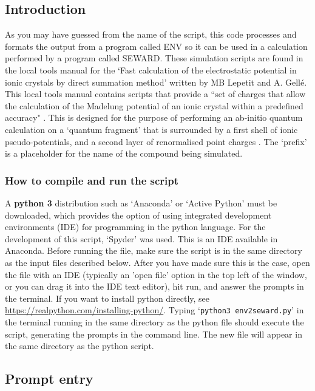 \documentclass[10pt]{article}
\begin{document}
\subsection{Introduction}
As you may have guessed from the name of the script, this code processes and formats the output from a program called ENV so it can be used in a calculation performed by a program called SEWARD. These simulation scripts are found in the local tools manual for the `Fast calculation of the electrostatic potential in ionic crystals by direct summation method' written by MB Lepetit and A. Gellé. This local tools manual contains scripts that provide a ``set of charges that allow the calculation of the Madelung potential of an ionic crystal within a predefined accuracy" \cite{gelle2008fast}. This is designed for the purpose of performing an ab-initio quantum calculation on a `quantum fragment' that is surrounded by a first shell of ionic pseudo-potentials, and a second layer of renormalised point charges \cite{varignon2013ab}. The `prefix' is a placeholder for the name of the compound being simulated.

\subsubsection{How to compile and run the script}
A {\bf python 3} distribution such as `Anaconda' or `Active Python' must be downloaded, which provides the option of using integrated development environments (IDE) for programming in the python language. For the development of this script, `Spyder' was used. This is an IDE available in Anaconda. Before running the file, make sure the script is in the same directory as the input files described below. After you have made sure this is the case, open the file with an IDE (typically an 'open file' option in the top left of the window, or you can drag it into the IDE text editor), hit run, and answer the prompts in the terminal. If you want to install python directly, see \url{https://realpython.com/installing-python/}. Typing `\texttt{python3 env2seward.py}' in the terminal running in the same directory as the python file should execute the script, generating the prompts in the command line. The new file will appear in the same directory as the python script.
\subsection{Prompt entry}
\end{document}

